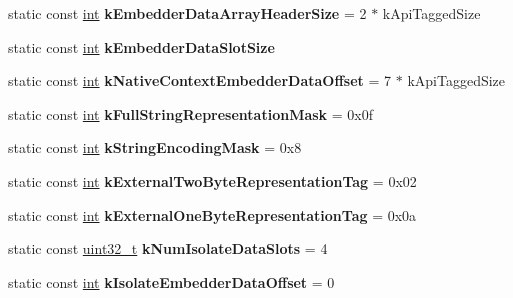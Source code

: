 \begin{DoxyCompactItemize}
\item 
\mbox{\label{classv8_1_1internal_1_1Internals_a080e5babff09ca38831e9b887233c432}} 
static const \mbox{\hyperlink{classint}{int}} {\bfseries k\+Embedder\+Data\+Array\+Header\+Size} = 2 $\ast$ k\+Api\+Tagged\+Size
\item 
static const \mbox{\hyperlink{classint}{int}} {\bfseries k\+Embedder\+Data\+Slot\+Size}
\item 
\mbox{\label{classv8_1_1internal_1_1Internals_a691a2ab474f9e770dfea35a8c1a71abd}} 
static const \mbox{\hyperlink{classint}{int}} {\bfseries k\+Native\+Context\+Embedder\+Data\+Offset} = 7 $\ast$ k\+Api\+Tagged\+Size
\item 
\mbox{\label{classv8_1_1internal_1_1Internals_a5c39a86b30463928ea719def66916507}} 
static const \mbox{\hyperlink{classint}{int}} {\bfseries k\+Full\+String\+Representation\+Mask} = 0x0f
\item 
\mbox{\label{classv8_1_1internal_1_1Internals_a1927ac3def13a57e03025e62ca46d1c5}} 
static const \mbox{\hyperlink{classint}{int}} {\bfseries k\+String\+Encoding\+Mask} = 0x8
\item 
\mbox{\label{classv8_1_1internal_1_1Internals_a73faf917416d2519b65c7255e77a74ce}} 
static const \mbox{\hyperlink{classint}{int}} {\bfseries k\+External\+Two\+Byte\+Representation\+Tag} = 0x02
\item 
\mbox{\label{classv8_1_1internal_1_1Internals_ac789a0a139ccbacec0c5fb2d79427305}} 
static const \mbox{\hyperlink{classint}{int}} {\bfseries k\+External\+One\+Byte\+Representation\+Tag} = 0x0a
\item 
\mbox{\label{classv8_1_1internal_1_1Internals_a258de87ae638f06a1deebccf4fd93c3f}} 
static const \mbox{\hyperlink{classuint32__t}{uint32\+\_\+t}} {\bfseries k\+Num\+Isolate\+Data\+Slots} = 4
\item 
\mbox{\label{classv8_1_1internal_1_1Internals_ad722bf4760df09958cd1062db4a5524c}} 
static const \mbox{\hyperlink{classint}{int}} {\bfseries k\+Isolate\+Embedder\+Data\+Offset} = 0

\end{DoxyCompactItemize}
